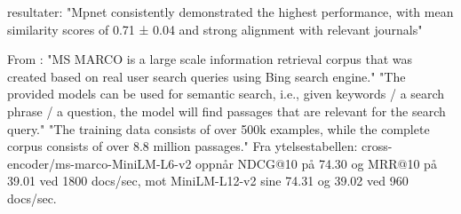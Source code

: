 resultater:
"Mpnet consistently demonstrated the highest performance, with mean similarity scores of 0.71 ± 0.04 and strong alignment with relevant journals"

From \parencite{sbert_crossencoder_msmarco}:
"MS MARCO is a large scale information retrieval corpus that was created based on real user search queries using Bing search engine."
"The provided models can be used for semantic search, i.e., given keywords / a search phrase / a question, the model will find passages that are relevant for the search query."
"The training data consists of over 500k examples, while the complete corpus consists of over 8.8 million passages."
Fra ytelsestabellen: cross-encoder/ms-marco-MiniLM-L6-v2 oppnår NDCG@10 på 74.30 og MRR@10 på 39.01 ved 1800 docs/sec, mot MiniLM-L12-v2 sine 74.31 og 39.02 ved 960 docs/sec.


